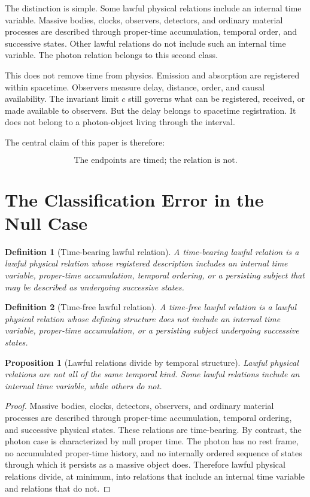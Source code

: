 \documentclass[12pt,onecolumn]{article}
\newtheorem{proposition}{Proposition}
\newtheorem{definition}{Definition}
\begin{document}
The distinction is simple. Some lawful physical relations include an internal time variable. Massive bodies, clocks, observers, detectors, and ordinary material processes are described through proper-time accumulation, temporal order, and successive states. Other lawful relations do not include such an internal time variable. The photon relation belongs to this second class.

This does not remove time from physics. Emission and absorption are registered within spacetime. Observers measure delay, distance, order, and causal availability. The invariant limit $c$ still governs what can be registered, received, or made available to observers. But the delay belongs to spacetime registration. It does not belong to a photon-object living through the interval.

The central claim of this paper is therefore:

\[
\text{The endpoints are timed; the relation is not.}
\]

\section{The Classification Error in the Null Case}

\begin{definition}[Time-bearing lawful relation]
A time-bearing lawful relation is a lawful physical relation whose registered description includes an internal time variable, proper-time accumulation, temporal ordering, or a persisting subject that may be described as undergoing successive states.
\end{definition}

\begin{definition}[Time-free lawful relation]
A time-free lawful relation is a lawful physical relation whose defining structure does not include an internal time variable, proper-time accumulation, or a persisting subject undergoing successive states.
\end{definition}

\begin{proposition}[Lawful relations divide by temporal structure]
Lawful physical relations are not all of the same temporal kind. Some lawful relations include an internal time variable, while others do not.
\end{proposition}

\begin{proof}
Massive bodies, clocks, detectors, observers, and ordinary material processes are described through proper-time accumulation, temporal ordering, and successive physical states. These relations are time-bearing. By contrast, the photon case is characterized by null proper time. The photon has no rest frame, no accumulated proper-time history, and no internally ordered sequence of states through which it persists as a massive object does. Therefore lawful physical relations divide, at minimum, into relations that include an internal time variable and relations that do not.
\end{proof}
\end{document}
